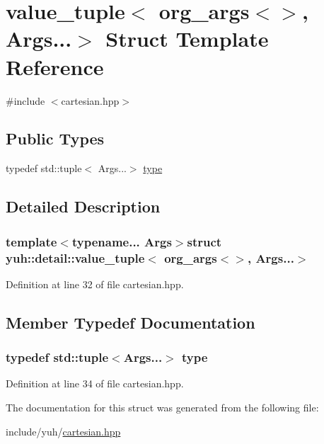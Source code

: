 \hypertarget{structyuh_1_1detail_1_1value__tuple_3_01org__args_3_4_00_01Args_8_8_8_4}{\section{value\-\_\-tuple$<$ org\-\_\-args$<$$>$, \-Args...$>$ \-Struct \-Template \-Reference}
\label{d0/d2a/structyuh_1_1detail_1_1value__tuple_3_01org__args_3_4_00_01Args_8_8_8_4}
}


{\ttfamily \#include $<$cartesian.\-hpp$>$}

\subsection*{\-Public \-Types}
\begin{DoxyCompactItemize}
\item 
typedef std\-::tuple$<$ \-Args...$>$ \hyperlink{structyuh_1_1detail_1_1value__tuple_3_01org__args_3_4_00_01Args_8_8_8_4_a0c208c6f55e889b43018b13a7aa6a8da}{type}
\end{DoxyCompactItemize}


\subsection{\-Detailed \-Description}
\subsubsection*{template$<$typename... \-Args$>$struct yuh\-::detail\-::value\-\_\-tuple$<$ org\-\_\-args$<$$>$, Args...$>$}



\-Definition at line 32 of file cartesian.\-hpp.



\subsection{\-Member \-Typedef \-Documentation}
\hypertarget{structyuh_1_1detail_1_1value__tuple_3_01org__args_3_4_00_01Args_8_8_8_4_a0c208c6f55e889b43018b13a7aa6a8da}{
\subsubsection[{type}]{\setlength{\rightskip}{0pt plus 5cm}typedef std\-::tuple$<$\-Args...$>$ {\bf type}}}\label{d0/d2a/structyuh_1_1detail_1_1value__tuple_3_01org__args_3_4_00_01Args_8_8_8_4_a0c208c6f55e889b43018b13a7aa6a8da}


\-Definition at line 34 of file cartesian.\-hpp.



\-The documentation for this struct was generated from the following file\-:\begin{DoxyCompactItemize}
\item 
include/yuh/\hyperlink{cartesian_8hpp}{cartesian.\-hpp}\end{DoxyCompactItemize}
